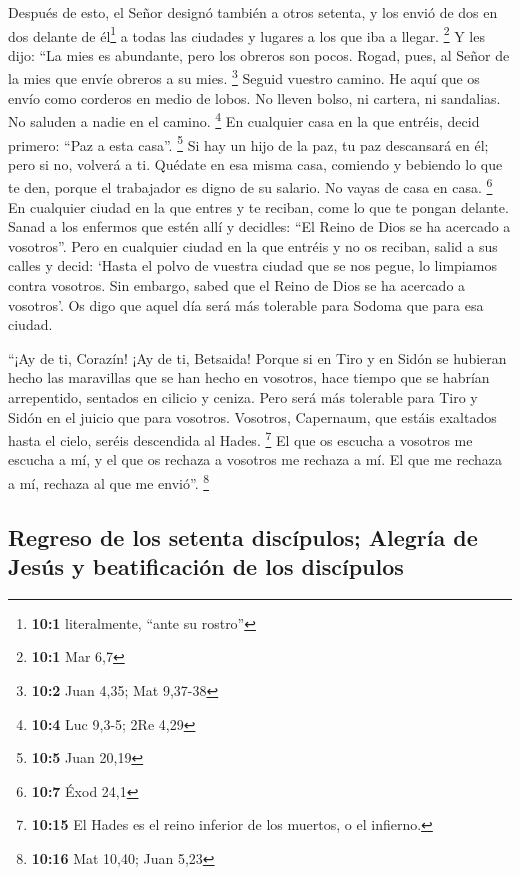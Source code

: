 \begin{paracol}{2}
 Después de esto, el Señor designó también a otros
setenta, y los envió de dos en dos delante de él\footnote{\textbf{10:1}
  literalmente, ``ante su rostro''} a todas las ciudades y lugares a los
que iba a llegar. \footnote{\textbf{10:1} Mar 6,7}  Y les
dijo: ``La mies es abundante, pero los obreros son pocos. Rogad, pues,
al Señor de la mies que envíe obreros a su mies. \footnote{\textbf{10:2}
  Juan 4,35; Mat 9,37-38}  Seguid vuestro camino. He aquí
que os envío como corderos en medio de lobos.  No lleven
bolso, ni cartera, ni sandalias. No saluden a nadie en el camino.
\footnote{\textbf{10:4} Luc 9,3-5; 2Re 4,29}  En cualquier
casa en la que entréis, decid primero: ``Paz a esta casa''. \footnote{\textbf{10:5}
  Juan 20,19}  Si hay un hijo de la paz, tu paz descansará
en él; pero si no, volverá a ti.  Quédate en esa misma
casa, comiendo y bebiendo lo que te den, porque el trabajador es digno
de su salario. No vayas de casa en casa. \footnote{\textbf{10:7} Éxod
  24,1}  En cualquier ciudad en la que entres y te
reciban, come lo que te pongan delante.  Sanad a los
enfermos que estén allí y decidles: ``El Reino de Dios se ha acercado a
vosotros''.  Pero en cualquier ciudad en la que entréis y
no os reciban, salid a sus calles y decid:  `Hasta el
polvo de vuestra ciudad que se nos pegue, lo limpiamos contra vosotros.
Sin embargo, sabed que el Reino de Dios se ha acercado a vosotros'.
 Os digo que aquel día será más tolerable para Sodoma que
para esa ciudad.

 ``¡Ay de ti, Corazín! ¡Ay de ti, Betsaida! Porque si en
Tiro y en Sidón se hubieran hecho las maravillas que se han hecho en
vosotros, hace tiempo que se habrían arrepentido, sentados en cilicio y
ceniza.  Pero será más tolerable para Tiro y Sidón en el
juicio que para vosotros.  Vosotros, Capernaum, que
estáis exaltados hasta el cielo, seréis descendida al Hades. \footnote{\textbf{10:15}
  El Hades es el reino inferior de los muertos, o el infierno.}
 El que os escucha a vosotros me escucha a mí, y el que
os rechaza a vosotros me rechaza a mí. El que me rechaza a mí, rechaza
al que me envió''. \footnote{\textbf{10:16} Mat 10,40; Juan 5,23}

\hypertarget{regreso-de-los-setenta-discuxedpulos-alegruxeda-de-jesuxfas-y-beatificaciuxf3n-de-los-discuxedpulos}{%
\subsection{Regreso de los setenta discípulos; Alegría de Jesús y
beatificación de los
discípulos}\label{regreso-de-los-setenta-discuxedpulos-alegruxeda-de-jesuxfas-y-beatificaciuxf3n-de-los-discuxedpulos}}


\end{paracol}

